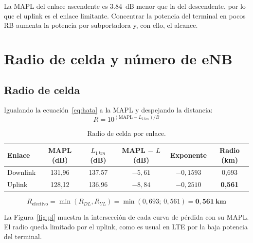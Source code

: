 \documentclass[11pt,letterpaper]{article}
\begin{document}
La MAPL del enlace ascendente es \SI{3.84}{dB} menor que la del descendente, por lo que el uplink es el enlace limitante. Concentrar la potencia del terminal en pocos RB aumenta la potencia por subportadora y, con ello, el alcance.

\section{Radio de celda y número de eNB}

\subsection{Radio de celda}

Igualando la ecuación~\eqref{eq:hata} a la MAPL y despejando la distancia:
\begin{equation}
R = 10^{\left(\mathrm{MAPL} - L_{1\,km}\right)/B}
\label{eq:radio}
\end{equation}

\begin{table}[H]
\centering
\caption{Radio de celda por enlace.}
\label{tab:radio}
\begin{tabular}{@{}lccccc@{}}
\toprule
\textbf{Enlace} & \textbf{MAPL (dB)} & \textbf{$L_{1\,km}$ (dB)} & \textbf{MAPL $-$ $L$ (dB)} & \textbf{Exponente} & \textbf{Radio (km)} \\
\midrule
Downlink & 131,96 & 137,57 & $-5{,}61$ & $-0{,}1593$ & 0,693 \\
Uplink & 128,12 & 136,96 & $-8{,}84$ & $-0{,}2510$ & \textbf{0,561} \\
\bottomrule
\end{tabular}
\end{table}

\[
R_{\text{efectivo}} = \min(R_{DL},R_{UL}) = \min(0{,}693;\ 0{,}561) = \mathbf{0{,}561\ km}
\]

La Figura~\ref{fig:pl} muestra la intersección de cada curva de pérdida con su MAPL. El radio queda limitado por el uplink, como es usual en LTE por la baja potencia del terminal.
\end{document}
